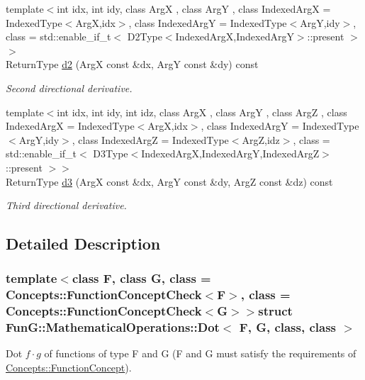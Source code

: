 \begin{DoxyCompactItemize}
{\footnotesize template$<$int idx, int idy, class Arg\-X , class Arg\-Y , class Indexed\-Arg\-X  = Indexed\-Type$<$\-Arg\-X,idx$>$, class Indexed\-Arg\-Y  = Indexed\-Type$<$\-Arg\-Y,idy$>$, class  = std\-::enable\-\_\-if\-\_\-t$<$ D2\-Type$<$\-Indexed\-Arg\-X,\-Indexed\-Arg\-Y$>$\-::present $>$$>$ }\\Return\-Type \hyperlink{structFunG_1_1MathematicalOperations_1_1Dot_a1f6635249552959c216f3f15f5fc0037}{d2} (Arg\-X const \&dx, Arg\-Y const \&dy) const 
\begin{DoxyCompactList}\small\item\em Second directional derivative. \end{DoxyCompactList}\item 
{\footnotesize template$<$int idx, int idy, int idz, class Arg\-X , class Arg\-Y , class Arg\-Z , class Indexed\-Arg\-X  = Indexed\-Type$<$\-Arg\-X,idx$>$, class Indexed\-Arg\-Y  = Indexed\-Type$<$\-Arg\-Y,idy$>$, class Indexed\-Arg\-Z  = Indexed\-Type$<$\-Arg\-Z,idz$>$, class  = std\-::enable\-\_\-if\-\_\-t$<$ D3\-Type$<$\-Indexed\-Arg\-X,\-Indexed\-Arg\-Y,\-Indexed\-Arg\-Z$>$\-::present $>$$>$ }\\Return\-Type \hyperlink{structFunG_1_1MathematicalOperations_1_1Dot_a1fe7dc4596f532e9568e48945c07d00b}{d3} (Arg\-X const \&dx, Arg\-Y const \&dy, Arg\-Z const \&dz) const 
\begin{DoxyCompactList}\small\item\em Third directional derivative. \end{DoxyCompactList}\end{DoxyCompactItemize}


\subsection{Detailed Description}
\subsubsection*{template$<$class F, class G, class = Concepts\-::\-Function\-Concept\-Check$<$\-F$>$, class = Concepts\-::\-Function\-Concept\-Check$<$\-G$>$$>$struct Fun\-G\-::\-Mathematical\-Operations\-::\-Dot$<$ F, G, class, class $>$}

Dot $f \cdot g$ of functions of type F and G (F and G must satisfy the requirements of \hyperlink{structFunG_1_1Concepts_1_1FunctionConcept}{Concepts\-::\-Function\-Concept}). 

